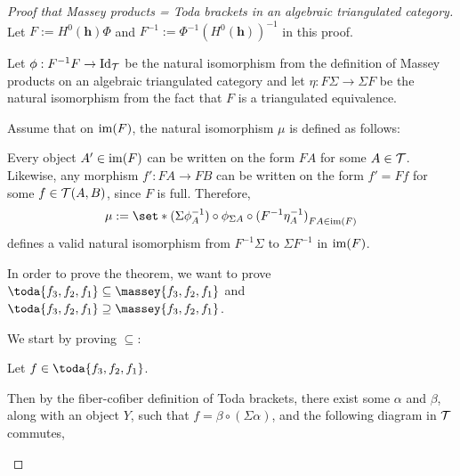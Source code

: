 \begin{proof}[Proof that Massey products = Toda brackets in an algebraic triangulated category]
    \phantom{hei}

    Let \( F := H^0(\mathbf{h}) \Phi \) and \( F^{-1} := \Phi^{-1} (H^0(\mathbf{h}))^{-1} \) in this proof.

    Let \( \phi: F^{-1} F \to \operatorname{Id}_{{\mathcal{T}}} \) be the natural isomorphism from the definition of Massey products on an algebraic triangulated category and let \( \eta: F \Sigma \to \Sigma F \) be the natural isomorphism from the fact that \( F \) is a triangulated equivalence.

    Assume that on \( \operatorname{im}(F) \), the natural isomorphism \( \mu \) is defined as follows: 
    
    Every object \( A' \in \operatorname{im}(F) \) can be written on the form \( F A \) for some \( A \in {\mathcal{T}} \). Likewise, any morphism \( f': F A \to F B \) can be written on the form \( f' = F f \) for some \( f \in {\mathcal{T}}(A, B) \), since \( F \) is full. Therefore,
    \[
        \mu := \set*{ (\Sigma \phi^{-1}_A) \circ \phi_{\Sigma A} \circ (F^{-1} \eta^{-1}_A)}_{F A \in \im(F)}
    \]
    defines a valid natural isomorphism from \(  F^{-1} \Sigma \) to \( \Sigma F^{-1} \) in \( \operatorname{im}(F) \).

    In order to prove the theorem, we want to prove \( \toda{f_3, f_2, f_1} \subseteq \massey{f_3, f_2, f_1} \) and \( \toda{f_3, f_2, f_1} \supseteq \massey{f_3, f_2, f_1} \).

    We start by proving \( \subseteq \):
    
    Let \( f \in \toda{f_3, f_2, f_1} \).

    Then by the fiber-cofiber definition of Toda brackets, there exist some \( \alpha \) and \( \beta \), along with an object \( Y \), such that \( f = \beta \circ (\Sigma \alpha) \), and the following diagram in \( {\mathcal{T}} \) commutes,
    \begin{center}
\end{center}
\end{proof}
